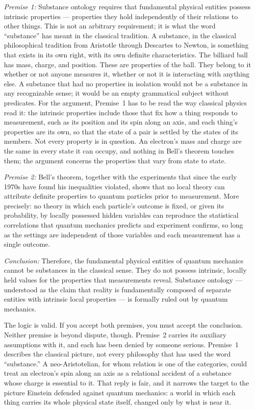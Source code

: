 \emph{Premise 1:} Substance ontology requires that fundamental physical entities
possess intrinsic properties --- properties they hold independently of their
relations to other things.
This is not an arbitrary requirement; it is what the word ``substance'' has meant
in the classical tradition.
A substance, in the classical philosophical tradition from Aristotle through
Descartes to Newton, is something that exists in its own right, with its own
definite characteristics.
The billiard ball has mass, charge, and position.
These are properties of the ball.
They belong to it whether or not anyone measures it, whether or not it is
interacting with anything else.
A substance that had no properties in isolation would not be a substance in any
recognizable sense; it would be an empty grammatical subject without predicates.
For the argument, Premise~1 has to be read the way classical physics read it:
the intrinsic properties include those that fix how a thing responds to
measurement, such as its position and its spin along an axis, and each thing's
properties are its own, so that the state of a pair is settled by the states of
its members.
Not every property is in question.
An electron's mass and charge are the same in every state it can occupy, and
nothing in Bell's theorem touches them; the argument concerns the properties that
vary from state to state.

\emph{Premise 2:} Bell's theorem, together with the experiments that since the
early 1970s have found his inequalities violated, shows that no local theory can
attribute definite properties to quantum particles prior to measurement.
More precisely: no theory in which each particle's outcome is fixed, or given its
probability, by locally possessed hidden variables can reproduce the statistical
correlations that quantum mechanics predicts and experiment confirms, so long as
the settings are independent of those variables and each measurement has a
single outcome.

\emph{Conclusion:} Therefore, the fundamental physical entities of quantum
mechanics cannot be substances in the classical sense.
They do not possess intrinsic, locally held values for the properties that
measurements reveal.
Substance ontology --- understood as the claim that reality is fundamentally
composed of separate entities with intrinsic local properties --- is formally
ruled out by quantum mechanics.

The logic is valid.
If you accept both premises, you must accept the conclusion.
Neither premise is beyond dispute, though.
Premise~2 carries its auxiliary assumptions with it, and each has been denied by
someone serious.
Premise~1 describes the classical picture, not every philosophy that has used
the word ``substance.''
A neo-Aristotelian, for whom relation is one of the categories, could treat an
electron's spin along an axis as a relational accident of a substance whose
charge is essential to it.
That reply is fair, and it narrows the target to the picture Einstein defended
against quantum mechanics: a world in which each thing carries its whole physical
state itself, changed only by what is near it.

